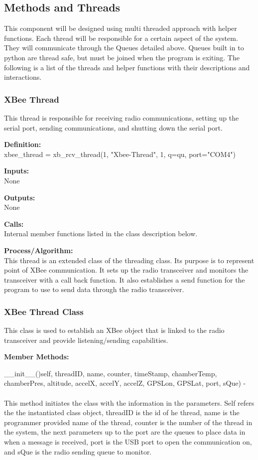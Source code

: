 \documentclass[10pt,draftclsnofoot,onecolumn,compsoc]{IEEEtran}
\begin{document}
\subsection{Methods and Threads}
This component will be designed using multi threaded approach with helper functions. Each thread will be responsible for a certain aspect of the system. They will communicate through the Queues detailed above. Queues built in to python are thread safe, but must be joined when the program is exiting. The following is a list of the threads and helper functions with their descriptions and interactions.

\subsubsection{XBee Thread}
This thread is responsible for receiving radio communications, setting up the serial port, sending communications, and shutting down the serial port. \par
{\bf Definition:} \\ 
xbee\_thread = xb\_rcv\_thread(1, "Xbee-Thread", 1, q=qu, port="COM4")  \par
{\bf Inputs:} \\  None \par
{\bf Outputs:} \\ None \par
{\bf Calls:} \\ Internal member functions listed in the class description below. \par
{\bf Process/Algorithm:} \\
This thread is an extended class of the threading class. Its purpose is to represent point of XBee communication. It sets up the radio transceiver and monitors the transceiver with a call back function. It also establishes a send function for the program to use to send data through the radio transceiver.  \par

\subsubsection{XBee Thread Class}
This class is used to establish an XBee object that is linked to the radio transceiver and provide listening/sending capabilities. \par

{\bf Member Methods:} \par

 \_\_init\_\_()self, threadID, name, counter, timeStamp, chamberTemp, chamberPres, altitude, accelX, accelY, accelZ, GPSLon, GPSLat, port, sQue) - \\ \\
This method initiates the class with the information in the parameters. Self refers the the instantiated class object, threadID is the id of he thread, name is the programmer provided name of the thread, counter is the number of the thread in the system, the next parameters up to the port are the queues to place data in when a message is received, port is the USB port to open the communication on, and sQue is the radio sending queue to monitor. \par
\end{document}
